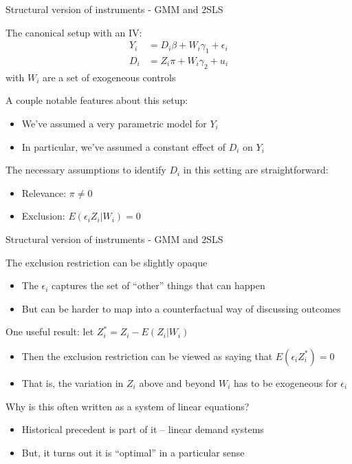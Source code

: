 \documentclass[notes,11pt, aspectratio=169]{beamer}
\newenvironment{wideitemize}{\itemize\addtolength{\itemsep}{10pt}}{\enditemize}
\begin{document}
\begin{frame}{Structural version of instruments - GMM and 2SLS}
  \begin{wideitemize}
  \item The canonical setup with an IV:
    \begin{align*}
      Y_{i} &= D_{i}\beta + W_{i}\gamma_{1} + \epsilon_{i}\\
      D_{i} &= Z_{i}\pi + W_{i}\gamma_{2} + u_{i}
    \end{align*}
    with $W_{i}$ are a set of exogeneous controls
  \item A couple notable features about this setup:
    \begin{itemize}
    \item We've assumed a very parametric model for $Y_{i}$
    \item In particular, we've assumed a constant effect of $D_{i}$ on $Y_{i}$
    \end{itemize}
  \item The necessary assumptions to identify $D_{i}$ in this setting are straightforward:
    \begin{itemize}
    \item Relevance: $\pi \not = 0$
    \item Exclusion: $E(\epsilon_{i}Z_{i} | W_{i}) = 0$
    \end{itemize}
  \end{wideitemize}
\end{frame}

\begin{frame}{Structural version of instruments - GMM and 2SLS}
  \begin{wideitemize}
  \item The exclusion restriction can be slightly opaque
    \begin{itemize}
    \item The $\epsilon_{i}$ captures the set of ``other'' things that can happen
    \item But can be harder to map into a counterfactual way of discussing outcomes
    \end{itemize}
  \item One useful result: let $Z_{i}^{*} = Z_{i} - E(Z_{i} | W_{i})$
    \begin{itemize}
    \item Then the exclusion restriction can be viewed as saying that
      $E(\epsilon_{i}Z_{i}^{*}) = 0$
    \item That is, the variation in $Z_{i}$ above and beyond $W_{i}$
      has to be exogeneous for $\epsilon_{i}$
    \end{itemize}
  \item Why is this often written as a system of linear equations?
    \begin{itemize}
    \item Historical precedent is part of it -- linear demand systems
    \item But, it turns out it is ``optimal'' in a particular sense
    \end{itemize}
  \end{wideitemize}
\end{frame}
\end{document}
